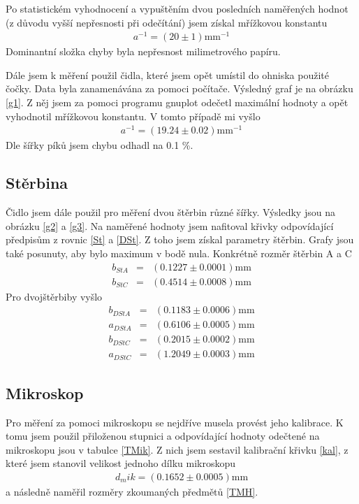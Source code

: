 \documentclass[a4paper,12pt]{article}
\begin{document}
Po statistickém vyhodnocení a vypuštěním dvou posledních naměřených hodnot (z důvodu vyšší nepřesnosti při odečítání) jsem získal mřížkovou konstantu
\begin{eqnarray}
a^{-1}=(20\pm 1)\mbox{mm}^{-1}
\end{eqnarray}
Dominantní složka chyby byla nepřesnost milimetrového papíru.

Dále jsem k měření použil čidla, které jsem opět umístil do ohniska použité čočky. Data byla zanamenávána za pomoci počítače. Výsledný graf je na obrázku \ref{g1}. 
Z něj jsem za pomoci programu gnuplot odečetl maximální hodnoty a opět vyhodnotil mřížkovou konstantu. V tomto případě mi vyšlo
\begin{eqnarray}
a^{-1}=(19.24 \pm 0.02)\mbox{mm}^{-1}
\end{eqnarray}
Dle šířky píků jsem chybu odhadl na 0.1 \%.

\subsection{Stěrbina}
Čidlo jsem dále použil pro měření dvou štěrbin různé šířky. Výsledky jsou na obrázku 
\ref{g2} a \ref{g3}. Na naměřené hodnoty jsem nafitoval křivky odpovídající předpisům z rovnic \ref{St} a \ref{DSt}. Z toho jsem získal parametry štěrbin. Grafy jsou také posunuty, aby bylo maximum v bodě nula. Konkrétně rozměr štěrbin A a C
\begin{eqnarray}
b_{StA}&=&(0.1227 \pm 0.0001) \mbox{mm}\\
b_{StC}&=&(0.4514 \pm 0.0008) \mbox{mm}
\end{eqnarray}
Pro dvojštěrbiby vyšlo
\begin{eqnarray}
b_{DStA}&=&(0.1183 \pm 0.0006) \mbox{mm}\\
a_{DStA}&=&(0.6106 \pm 0.0005) \mbox{mm}\\
b_{DStC}&=&(0.2015 \pm 0.0002) \mbox{mm}\\
a_{DStC}&=&(1.2049 \pm 0.0003) \mbox{mm}
\end{eqnarray}

\subsection{Mikroskop}
Pro měření za pomoci mikroskopu se nejdříve musela provést jeho kalibrace. K tomu jsem 
použil přiloženou stupnici a odpovídající hodnoty odečtené na mikroskopu jsou v tabulce 
\ref{TMik}. Z nich jsem sestavil kalibrační křivku \ref{kal}, z které jsem stanovil velikost jednoho dílku mikroskopu
\begin{eqnarray}
d_mik=(0.1652\pm0.0005) \mbox{mm}
\end{eqnarray}
a následně naměřil rozměry zkoumaných předmětů \ref{TMH}.
\end{document}
